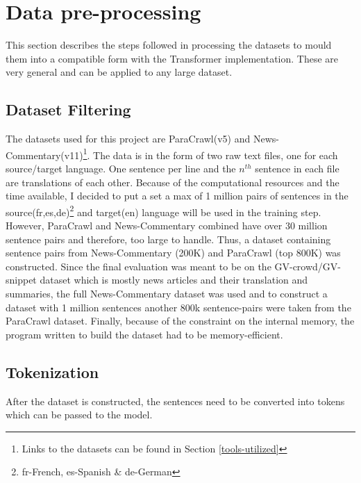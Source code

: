 \documentclass[12pt,a4paper,twoside,openright]{report}
\begin{document}
\section{Data pre-processing}
\label{pre-processing}
This section describes the steps followed in processing the datasets to mould them into a compatible form with the Transformer implementation. These are very general and can be applied to any large dataset.

\subsection{Dataset Filtering}
\label{dataset-clipping}
The datasets used for this project are ParaCrawl(v5) and News-Commentary(v11)\footnote{Links to the datasets can be found in Section \ref{tools-utilized}}. The data is in the form of two raw text files, one for each source/target language. One sentence per line and the $n^{th}$ sentence in each file are translations of each other. Because of the computational resources and the time available, I decided to put a set a max of 1 million pairs of sentences in the source(fr,es,de)\footnote{fr-French, es-Spanish \& de-German} and target(en) language will be used in the training step. However, ParaCrawl and News-Commentary combined have over 30 million sentence pairs and therefore, too large to handle. Thus, a dataset containing sentence pairs from News-Commentary (200K) and ParaCrawl (top 800K) was constructed. Since the final evaluation was meant to be on the GV-crowd/GV-snippet dataset which is mostly news articles and their translation and summaries, the full News-Commentary dataset was used and to construct a dataset with 1 million sentences another 800k sentence-pairs were taken from the ParaCrawl dataset. Finally, because of the constraint on the internal memory, the program written to build the dataset had to be memory-efficient.



\subsection{Tokenization}
\label{tokenization}
After the dataset is constructed, the sentences need to be converted into tokens which can be passed to the model.
\end{document}
